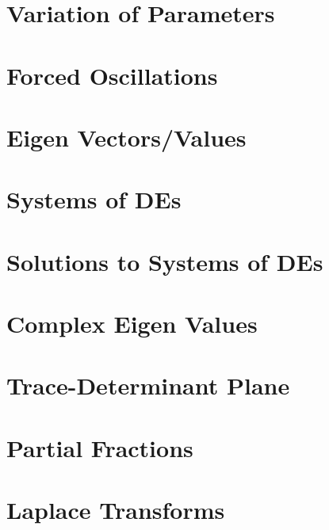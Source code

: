 \documentclass{beamer}
\begin{document}




\part{Variation of Parameters}



\part{Forced Oscillations}







\part{Eigen Vectors/Values}






\part{Systems of DEs}



\part{Solutions to Systems of DEs}




\part{Complex Eigen Values}




\part{Trace-Determinant Plane}





\part{Partial Fractions}




\newcommand{\laplace}[1]{\makebox{$ {\cal L} \{ #1 \}$}}

\part{Laplace Transforms}


\end{document}
